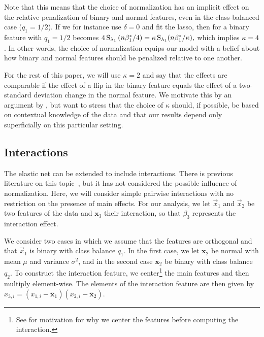 Note that this means that the choice of normalization has an implicit effect on the
relative penalization of binary and normal features, even in the class-balanced case (\(q_1
= 1/2\)). If we for instance use \(\delta=0\) and fit the lasso, then
 for a binary feature with \(q_1=1/2\) becomes
\(4\operatorname{S}_{\lambda_1}\left(n\beta_1^*/4\right) = \kappa \operatorname{S}_{\lambda_1}(n\beta_1^*/\kappa ),\)
which implies \(\kappa = 4\). In other words, the choice of normalization equips our model
with a belief about how binary and normal features should be penalized relative to one
another.

For the rest of this paper, we will use \(\kappa = 2\) and say that the effects are
comparable if the effect of a flip in the binary feature equals the effect of a
two-standard deviation change in the normal feature. We motivate this by an argument by
\citet{gelman2008}, but want to stress that the choice of \(\kappa\) should, if possible,
be based on contextual knowledge of the data and that our results depend only superficially
on this particular setting.


\subsection{Interactions}\label{sec:interactions}

The elastic net can be extended to include interactions. There is previous literature on
this topic~\citep{bien2013,zemlianskaia2022,lim2015}, but it has not considered the
possible influence of normalization. Here, we will consider simple pairwise interactions
with no restriction on the presence of main effects. For our analysis, we let \(\vec{x}_1\)
and \(\vec{x}_2\) be two features of the data and \(\bm{x}_3\) their interaction, so that
\(\beta_3\) represents the interaction effect.

We consider two cases in which we assume that the features are orthogonal and that
\(\vec{x}_1\) is binary with class balance \(q_1\). In the first case, we let \(\bm{x}_2\)
be normal with mean \(\mu\) and variance \(\sigma^2\), and in the second case \(\bm{x}_2\)
be binary with class balance \(q_2\). To construct the interaction feature, we
center\footnote{See  for motivation for why we center the
  features before computing the interaction.} the main features and then multiply
element-wise. The elements of the interaction feature are then given by \(x_{3,i} =
(x_{1,i} - \bar{\bm{x}}_1)(x_{2,i} - \bar{\bm{x}}_2)\).

